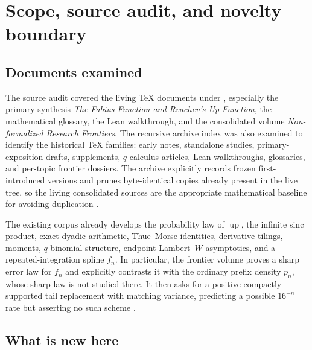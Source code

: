 \documentclass[11pt,oneside]{article}
\numberwithin{equation}{section}
\theoremstyle{definition}
\theoremstyle{remark}
\newcommand{\Up}{\operatorname{up}}
\begin{document}
\tableofcontents
\newpage

\section{Scope, source audit, and novelty boundary}
\label{p3:sec:scope}

\subsection{Documents examined}

The source audit covered the living TeX documents under
, especially the primary synthesis
\emph{The Fabius Function and Rvachev's Up-Function}, the mathematical glossary,
the Lean walkthrough, and the consolidated volume
\emph{Non-formalized Research Frontiers}.  The recursive archive index was also
examined to identify the historical TeX families: early notes, standalone studies,
primary-exposition drafts, supplements, $q$-calculus articles, Lean walkthroughs,
glossaries, and per-topic frontier dossiers.  The archive explicitly records frozen
first-introduced versions and prunes byte-identical copies already present in the live
tree, so the living consolidated sources are the appropriate mathematical baseline
for avoiding duplication \cite{p3:proveit-primary,p3:proveit-frontiers,p3:proveit-archive}.

The existing corpus already develops the probability law of $\Up$, the infinite sinc
product, exact dyadic arithmetic, Thue--Morse identities, derivative tilings, moments,
$q$-binomial structure, endpoint Lambert--$W$ asymptotics, and a repeated-integration
spline $f_n$.  In particular, the frontier volume proves a sharp error law for $f_n$
and explicitly contrasts it with the ordinary prefix density $p_n$, whose sharp law is
not studied there.  It then asks for a positive compactly supported tail replacement
with matching variance, predicting a possible $16^{-n}$ rate but asserting no such
scheme \cite{p3:proveit-frontiers}.

\subsection{What is new here}
\end{document}

